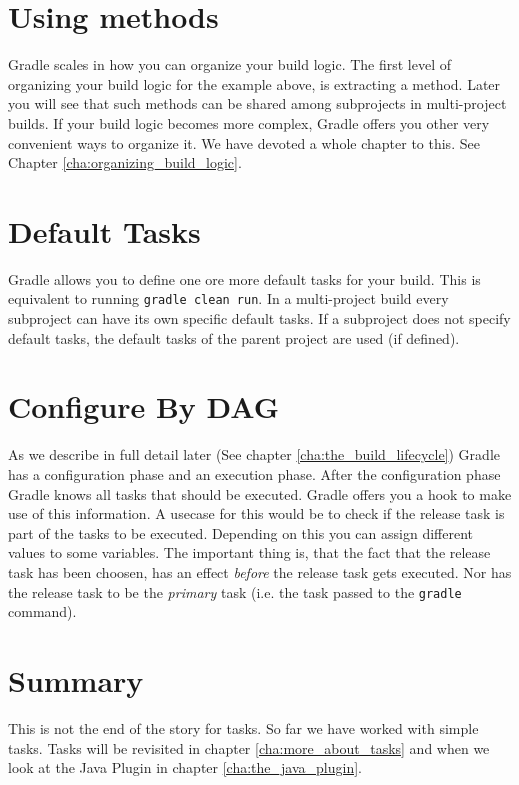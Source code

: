 \section{Using methods}
Gradle scales in how you can organize your build logic. The first level of organizing your build logic for the example above, is extracting a method.
Later you will see that such methods can be shared among subprojects in multi-project builds. If your build logic becomes more complex, Gradle offers you other very convenient ways to organize it. We have devoted a whole chapter to this. See Chapter \ref{cha:organizing_build_logic}. 

\section{Default Tasks} %
\label{sec:default_tasks}
Gradle allows you to define one ore more default tasks for your build. 
This is equivalent to running \texttt{gradle clean run}. In a multi-project build every subproject can have its own specific default tasks. If a subproject does not specify default tasks, the default tasks of the parent project are used (if defined).

\section{Configure By DAG}
As we describe in full detail later (See chapter \ref{cha:the_build_lifecycle}) Gradle has a configuration phase and an execution phase. After the configuration phase Gradle knows all tasks that should be executed. Gradle offers you a hook to make use of this information. A usecase for this would be to check if the release task is part of the tasks to be executed. Depending on this you can assign different values to some variables.
The important thing is, that the fact that the release task has been choosen, has an effect \emph{before} the release task gets executed. Nor has the release task to be the \emph{primary} task (i.e. the task passed to the \texttt{gradle} command). 

  
\section{Summary}
This is not the end of the story for tasks. So far we have worked with simple tasks. Tasks will be revisited in chapter \ref{cha:more_about_tasks} and when we look at the Java Plugin in chapter \ref{cha:the_java_plugin}.

